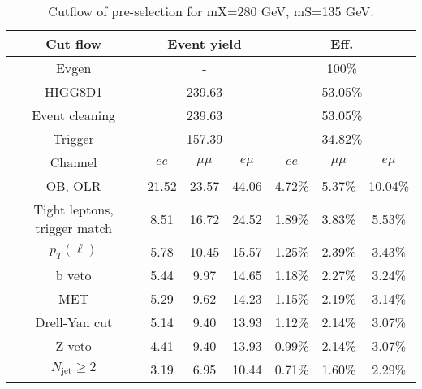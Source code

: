 \begin{table}
\centering\small
\begin{tabular}{c|ccc|ccc}
\hline
\hline
Cut flow &\multicolumn{3}{c|}{Event yield}&\multicolumn{3}{c}{Eff.}      \\
\hline
Evgen&\multicolumn{3}{c|}{-}&\multicolumn{3}{c}{100\%}\\
HIGG8D1&\multicolumn{3}{c|}{239.63}&\multicolumn{3}{c}{53.05\%}\\
Event cleaning&\multicolumn{3}{c|}{239.63}&\multicolumn{3}{c}{53.05\%}\\
Trigger&\multicolumn{3}{c|}{157.39    }&\multicolumn{3}{c}{34.82\%}\\
Channel&$ee$&$\mu\mu$&$e\mu$&$ee$&$\mu\mu$&$e\mu$\\
\hline
OB, OLR    &21.52    &23.57    &44.06& 4.72\%    &5.37\%    &10.04\%\\
Tight leptons, trigger match    &8.51    &16.72    &24.52    &1.89\%    &3.83\%    &5.53\%\\
$p_T(\ell)$    &5.78    &10.45    &15.57    &1.25\%    &2.39\%    &3.43\%\\
b veto    &5.44    &9.97    &14.65    &1.18\%    &2.27\%    &3.24\%\\
MET    &5.29    &9.62    &14.23    &1.15\%    &2.19\%    &3.14\%\\
Drell-Yan cut    &5.14    &9.40    &13.93    &1.12\%    &2.14\%    &3.07\%\\
Z veto    &4.41    &9.40    &13.93    &0.99\%    &2.14\%    &3.07\%\\
$N_{\text{jet}}\geq2$    &3.19    &6.95    &10.44    &0.71\%    &1.60\%    &2.29\%\\
\hline
\hline
\end{tabular}
\caption{Cutflow of pre-selection for mX=280 GeV, mS=135 GeV.}
\label{tab:cut_flow_preselection_mX260}
\end{table}

